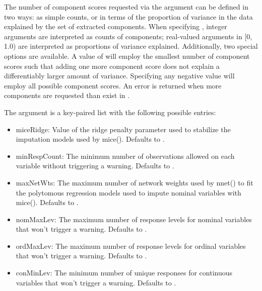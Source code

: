 \documentclass[letterpaper]{book}
\begin{document}
\begin{Details}\relax
The number of component scores requested via the 
argument can be defined in two ways: as simple counts, or in terms of
the proportion of variance in the data explained by the set of
extracted components. When specifying , integer
arguments are interpreted as counts of components; real-valued
arguments in [0, 1.0) are interpreted as proportions of
variance explained. Additionally, two special options are available. A
value of  will employ the smallest number of component
scores such that adding one more component score does not explain a
differentiably larger amount of variance. Specifying any negative
value will employ all possible component scores. An error is returned
when more components are requested than exist in . 

The  argument is a key-paired list with the following
possible entries:
\begin{itemize}

\item miceRidge: 
Value of the ridge penalty parameter used to stabilize the
imputation models used by mice(). Defaults to .

\item minRespCount: 
The minimum number of observations allowed on each variable without
triggering a warning. Defaults to .

\item maxNetWts: 
The maximum number of network weights used by nnet() to fit the
polytomous regression models used to impute nominal variables with
mice(). Defaults to .

\item nomMaxLev: 
The maximum number of response levels for nominal variables that
won't trigger a warning. Defaults to .

\item ordMaxLev: 
The maximum number of response levels for ordinal variables that
won't trigger a warning. Defaults to .

\item conMinLev: 
The minimum number of unique responses for continuous variables that
won't trigger a warning. Defaults to .


\end{itemize}

\end{Details}
\end{document}
